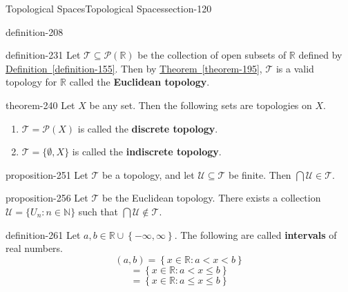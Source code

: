 \documentclass[oneside,10pt,]{article}
\newcommand{\terminology}[1]{\textbf{#1}}
\newcommand{\mb}{\mathbb}
\newcommand{\mc}{\mathcal}
\newcommand{\setBuilder}[2]{\left\{#1:#2\right\}}
\newcommand{\setList}[1]{\left\{#1\right\}}
\newcommand{\lt}{<}
\begin{document}
\begin{sectionptx}{Topological Spaces}{}{Topological Spaces}{}{}{section-120}
\begin{definition}{}{definition-208}
\end{definition}
\begin{definition}{}{definition-231}%
\hypertarget{p-232}{}%
Let \(\mc T\subseteq\mc P(\mb R)\) be the collection of open subsets of \(\mb R\) defined by \hyperref[definition-155]{Definition~\ref{definition-155}}. Then by \hyperref[theorem-195]{Theorem~\ref{theorem-195}}, \(\mc T\) is a valid topology for \(\mb R\) called the \terminology{Euclidean topology}.%
\end{definition}
\begin{theorem}{}{}{theorem-240}%
\hypertarget{p-241}{}%
Let \(X\) be any set. Then the following sets are topologies on \(X\).%
\leavevmode%
\begin{enumerate}
\item\hypertarget{li-245}{}\(\mc T=\mc P(X)\) is called the \terminology{discrete topology}.%
\item\hypertarget{li-248}{}\(\mc T=\{\emptyset,X\}\) is called the \terminology{indiscrete topology}.%
\end{enumerate}
\end{theorem}
\begin{proposition}{}{}{proposition-251}%
\hypertarget{p-252}{}%
Let \(\mc T\) be a topology, and let \(\mc U\subseteq\mc T\) be finite. Then \(\bigcap\mc U\in\mc T\).%
\end{proposition}
\begin{proposition}{}{}{proposition-256}%
\hypertarget{p-257}{}%
Let \(\mc T\) be the Euclidean topology. There exists a collection \(\mc U=\{U_n:n\in\mb N\}\) such that \(\bigcap\mc U\not\in\mc T\).%
\end{proposition}
\begin{definition}{}{definition-261}%
\hypertarget{p-262}{}%
Let \(a,b\in\mb R\cup\setList{-\infty,\infty}\). The following are called \terminology{intervals} of real numbers.%
%
\begin{equation*}
(a,b)=\setBuilder{x\in\mb R}{a\lt x\lt b}
\end{equation*}
%
\begin{equation*}
[a,b)=\setBuilder{x\in\mb R}{a\leq x\lt b}
\end{equation*}
%
\begin{equation*}
(a,b]=\setBuilder{x\in\mb R}{a\lt x\leq b}
\end{equation*}
%
\begin{equation*}
[a,b]=\setBuilder{x\in\mb R}{a\leq x\leq b}
\end{equation*}
\end{definition}

\end{sectionptx}
\end{document}
